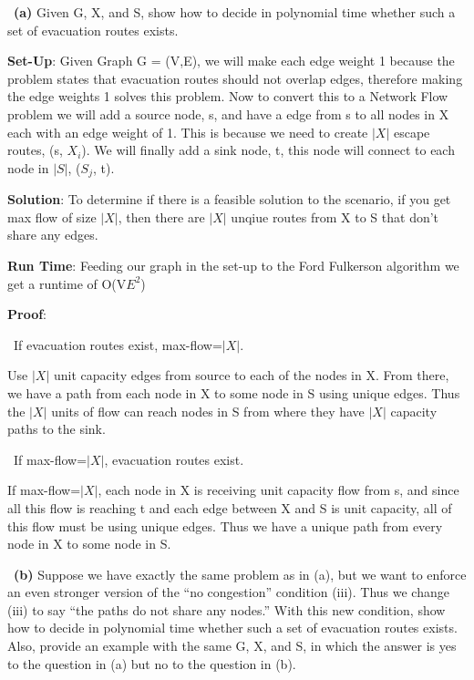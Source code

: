 \documentclass{article}
\begin{document}
{\indent\ \textbf{(a)} Given G, X, and S, show how to decide in polynomial time whether such a set of
evacuation routes exists. \newline

\textbf{Set-Up}: Given Graph G = (V,E), we will make each edge weight 1 because
the problem states that evacuation routes should not overlap edges, therefore
making the edge weights 1 solves this problem.  Now to convert this to a Network Flow
problem we will add a source node, s, and have a edge from s to all nodes in X
each with an edge weight of 1.  This is because we need to create $|{X}|$ escape
routes, (s, $X_{i}$).  We will finally add a sink node, t, this node will connect to each node
in $|{S}|$, ($S_{j}$, t). \newline

\textbf{Solution}: To determine if there is a feasible solution to the scenario, if you
get max flow of size $|{X}|$, then there are $|{X}|$ unqiue routes from X to S that
don't share any edges.  \newline

\textbf{Run Time}:  Feeding our graph in the set-up to the Ford Fulkerson algorithm we get a runtime of
O(V$E^{2}$) \newline

\textbf{Proof}:

{\centering\ If evacuation routes exist, max-flow=$|X|$. \par}

Use $|X|$ unit capacity edges from source to each of the nodes in X. From there, we
have a path from each node in X to some node in S using unique edges. Thus the $|X|$
units of flow can reach nodes in S from where they have $|X|$ capacity paths to the sink.

{\centering\ If max-flow=$|X|$, evacuation routes exist. \par}

If max-flow=$|X|$, each node in X is receiving unit capacity flow from s, and since all this
flow is reaching t and each edge between X and S is unit capacity, all of this flow must be
using unique edges. Thus we have a unique path from every node in X to some node in S. \newline


\indent\ \textbf{(b)} Suppose we have exactly the same problem as in (a), but we want to enforce an
even stronger version of the “no congestion” condition (iii). Thus we change (iii) to
say “the paths do not share any nodes.” With this new condition, show how to
decide in polynomial time whether such a set of evacuation routes exists.
Also, provide an example with the same G, X, and S, in which the answer is yes to
the question in (a) but no to the question in (b). \newline

}
\end{document}
